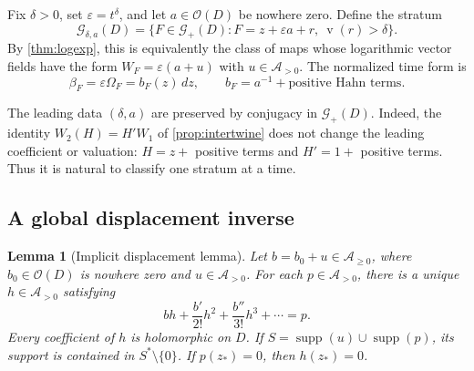 \documentclass[11pt,a4paper]{article}
\numberwithin{equation}{section}
\newtheorem{lemma}[lemma]{Lemma}
\theoremstyle{definition}
\theoremstyle{remark}
\newcommand{\A}{\mathcal A}
\newcommand{\G}{\mathcal G}
\newcommand{\Oh}{\mathcal O}
\newcommand{\eps}{\varepsilon}
\newcommand{\supp}{\operatorname{supp}}
\newcommand{\val}{\operatorname{v}}
\begin{document}
Fix $\delta>0$, set $\eps=t^\delta$, and let $a\in\Oh(D)$ be nowhere
zero.  Define the stratum
\begin{equation}\label{eq:stratum}
 \G_{\delta,a}(D)=
 \{F\in\G_+(D):F=z+\eps a+r,\ \val(r)>\delta\}.
\end{equation}
By \cref{thm:logexp}, this is equivalently the class of maps whose
logarithmic vector fields have the form
$W_F=\eps(a+u)$ with $u\in\A_{>0}$.
The normalized time form is
\begin{equation}\label{eq:normalized-form}
 \beta_F=\eps\Omega_F=b_F(z)\,dz,
 \qquad b_F=a^{-1}+\text{positive Hahn terms}.
\end{equation}

The leading data $(\delta,a)$ are preserved by conjugacy in $\G_+(D)$.
Indeed, the identity $W_2(H)=H'W_1$ of
\cref{prop:intertwine} does not change the leading coefficient or valuation:
$H=z+$ positive terms and $H'=1+$ positive terms.  Thus it is natural to
classify one stratum at a time.

\subsection{A global displacement inverse}

\begin{lemma}[Implicit displacement lemma]\label{lem:displacement}
Let $b=b_0+u\in\A_{\geq0}$, where $b_0\in\Oh(D)$ is nowhere zero and
$u\in\A_{>0}$.  For each $p\in\A_{>0}$, there is a unique
$h\in\A_{>0}$ satisfying
\begin{equation}\label{eq:implicit-displacement}
 b h+\frac{b'}{2!}h^2+\frac{b''}{3!}h^3+\cdots=p.
\end{equation}
Every coefficient of $h$ is holomorphic on $D$.  If
$S=\supp(u)\cup\supp(p)$, its support is contained in
$S^*\setminus\{0\}$.  If $p(z_*)=0$, then $h(z_*)=0$.
\end{lemma}
\end{document}
